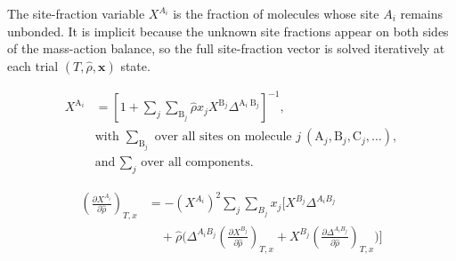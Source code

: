 \documentclass[12pt, letterpaper]{article}
\begin{document}
The site-fraction variable \(X^{A_i}\) is the fraction of molecules whose site \(A_i\) remains unbonded. It is implicit because the unknown site fractions appear on both sides of the mass-action balance, so the full site-fraction vector is solved iteratively at each trial \((T,\hat{\rho},\mathbf{x})\) state.

\begin{equation}
    \begin{aligned}
        X^{\mathrm{A}_{i}}
        &=\left[1+ \sum_{j} \sum_{\mathrm{B}_{j}} \hat{\rho} x_{j}X^{\mathrm{B}_{j}} \Delta^{\mathrm{A}_{i} \mathrm{~B}_{j}}\right]^{-1},
        \\
        &\text{with }\sum_{\mathrm{B}_{j}}\text{ over all sites on molecule }j\ (\mathrm{A}_{j},\mathrm{B}_{j},\mathrm{C}_{j},\ldots),
        \\
        &\text{and }\sum_{j}\text{ over all components.}
    \end{aligned}
    \label{eq:x_assoc_site}
\end{equation}


\begin{equation}
    \begin{aligned}
        \left(\frac{\partial X^{A_{i}}}{\partial\hat{\rho}}\right)_{T,x}
        &=-(X^{A_{i}})^{2}\sum_{j}\sum_{B_{j}}x_{j}
        \Bigg[
        X^{B_{j}}\Delta^{A_{i}B_{j}}
        \\
        &\quad +\hat{\rho}\Bigg(
        \Delta^{A_{i}B_{j}}\left(\frac{\partial X^{B_{j}}}{\partial\hat{\rho}}\right)_{T,x}
        +X^{B_{j}}\left(\frac{\partial\Delta^{A_{i}B_{j}}}{\partial\hat{\rho}}\right)_{T,x}
        \Bigg)
        \Bigg]
    \end{aligned}
    \label{eq:dx_assoc_drho}
\end{equation}
\end{document}
